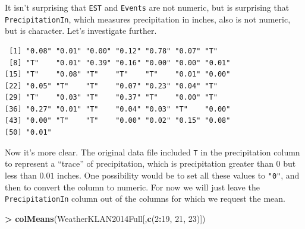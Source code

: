 \documentclass[]{krantz}
\makeatletter
\newenvironment{Shaded}{\begin{snugshade}}{\end{snugshade}}
\newcommand{\KeywordTok}[1]{\textcolor[rgb]{0.27,0.27,0.27}{\textbf{#1}}}
\newcommand{\DecValTok}[1]{\textcolor[rgb]{0.06,0.06,0.06}{#1}}
\newcommand{\StringTok}[1]{\textcolor[rgb]{0.5,0.5,0.5}{#1}}
\newcommand{\OperatorTok}[1]{\textcolor[rgb]{0.43,0.43,0.43}{\textbf{#1}}}
\newcommand{\NormalTok}[1]{#1}
\newenvironment{kframe}{%
\medskip{}
\setlength{\fboxsep}{.8em}
 \def\at@end@of@kframe{}%
 \ifinner\ifhmode%
  \def\at@end@of@kframe{\end{minipage}}%
  \begin{minipage}{\columnwidth}%
 \fi\fi%
 \def\FrameCommand##1{\hskip\@totalleftmargin \hskip-\fboxsep
 \colorbox{shadecolor}{##1}\hskip-\fboxsep
     \hskip-\linewidth \hskip-\@totalleftmargin \hskip\columnwidth}%
 \MakeFramed {\advance\hsize-\width
   \@totalleftmargin\z@ \linewidth\hsize
   \@setminipage}}%
 {\par\unskip\endMakeFramed%
 \at@end@of@kframe}
\renewenvironment{Shaded}{\begin{kframe}}{\end{kframe}}
\makeatother
\begin{document}
It isn't surprising that \texttt{EST} and \texttt{Events} are not
numeric, but is surprising that \texttt{PrecipitationIn}, which measures
precipitation in inches, also is not numeric, but is character. Let's
investigate further.

\begin{Shaded}
\end{Shaded}

\begin{verbatim}
 [1] "0.08" "0.01" "0.00" "0.12" "0.78" "0.07" "T"   
 [8] "T"    "0.01" "0.39" "0.16" "0.00" "0.00" "0.01"
[15] "T"    "0.08" "T"    "T"    "T"    "0.01" "0.00"
[22] "0.05" "T"    "T"    "0.07" "0.23" "0.04" "T"   
[29] "T"    "0.03" "T"    "0.37" "T"    "0.00" "T"   
[36] "0.27" "0.01" "T"    "0.04" "0.03" "T"    "0.00"
[43] "0.00" "T"    "T"    "0.00" "0.02" "0.15" "0.08"
[50] "0.01"
\end{verbatim}

Now it's more clear. The original data file included \texttt{T} in the
precipitation column to represent a ``trace'' of precipitation, which is
precipitation greater than \(0\) but less than \(0.01\) inches. One
possibility would be to set all these values to \texttt{"0"}, and then
to convert the column to numeric. For now we will just leave the
\texttt{PrecipitationIn} column out of the columns for which we request
the mean.

\begin{Shaded}
\begin{Highlighting}[]
\OperatorTok{>}\StringTok{ }\KeywordTok{colMeans}\NormalTok{(WeatherKLAN2014Full[,}\KeywordTok{c}\NormalTok{(}\DecValTok{2}\OperatorTok{:}\DecValTok{19}\NormalTok{, }\DecValTok{21}\NormalTok{, }\DecValTok{23}\NormalTok{)])}
\end{Highlighting}
\end{Shaded}
\end{document}
